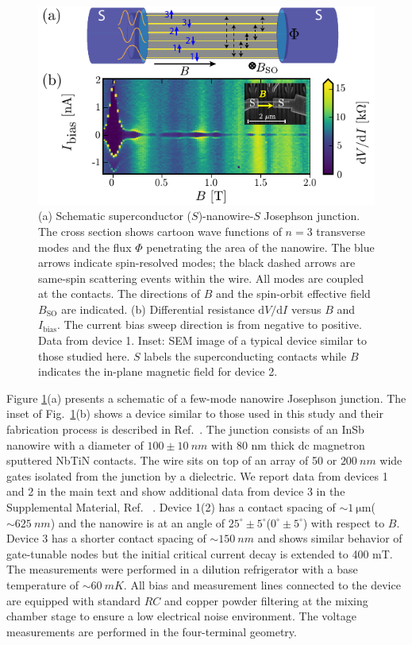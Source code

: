 \documentclass[english, twocolumn, 10pt, aps, superscriptaddress, floatfix, showpacs, prb, citeautoscript]{revtex4-1}
\begin{document}
\begin{figure}[ht]
\includegraphics[width=\columnwidth]{figures/fig1.pdf}
\caption{(a) Schematic superconductor ($S$)-nanowire-$S$ Josephson junction. The cross section shows cartoon wave functions of $n=3$ transverse modes and the flux $\Phi$ penetrating the area of the nanowire. The blue arrows indicate spin-resolved modes; the black dashed arrows are same-spin scattering events within the wire. All modes are coupled at the contacts. 
The directions of $B$ and the spin-orbit effective field $B_\mathrm{SO}$ are indicated. (b) Differential resistance $\mathrm{d}V/\mathrm{d}I$ versus $B$ and $I_\mathrm{bias}$.
The current bias sweep direction is from negative to positive. Data from device 1. Inset: SEM image of a typical device similar to those studied here. $S$ labels the superconducting contacts while $B$ indicates the in-plane magnetic field for device 2.}
\label{fig:figure1}
\end{figure}

Figure \ref{fig:figure1}(a) presents a schematic of a few-mode nanowire Josephson junction.
The inset of Fig.~\ref{fig:figure1}(b) shows a device similar to those used in this study and their fabrication process is described in Ref.~.
The junction consists of an InSb nanowire with a diameter of $100 \pm \SI{10}{nm}$ with 80 nm thick dc magnetron sputtered NbTiN contacts.
The wire sits on top of an array of 50 or $\SI{200}{nm}$ wide gates isolated from the junction by a dielectric. 
We report data from devices 1 and 2 in the main text and show additional data from device 3 in the Supplemental Material, Ref. ~.
Device 1(2) has a contact spacing of $\sim \SI{1}{\micro \m}$($\sim \SI{625}{nm}$) and the nanowire is at an angle of $25^\circ \pm 5^\circ$($0^\circ \pm 5^\circ$) with respect to $B$. 
Device 3 has a shorter contact spacing of $\sim \SI{150}{nm}$ and shows similar behavior of gate-tunable nodes but the initial critical current decay is extended to 400 mT.
The measurements were performed in a dilution refrigerator with a base temperature of $\sim\SI{60}{mK}$. 
All bias and measurement lines connected to the device are equipped with standard $RC$ and copper powder filtering at the mixing chamber stage to ensure a low electrical noise environment. 
The voltage measurements are performed in the four-terminal geometry.
\end{document}

